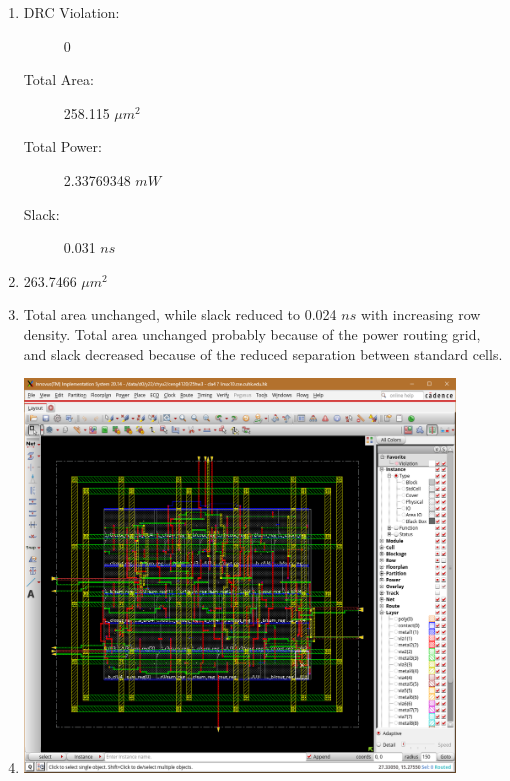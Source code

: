 \documentclass[12pt, a4paper]{article}
\begin{document}
\setcounter{section}{1}

\begin{enumerate}[label=\arabic*.]
    \item 
    \begin{description}
        \item[DRC Violation:] 0
        \item[Total Area:] 258.115 $\mu m^2$
        \item[Total Power:] 2.33769348 $mW$
        \item[Slack:] 0.031 $ns$
    \end{description}
    \item 263.7466 $\mu m^2$
    \item Total area unchanged, while slack reduced to 0.024 $ns$ with increasing row density. 
    Total area unchanged probably because of the power routing grid, 
    and slack decreased because of the reduced separation between standard cells. 
    \item \includegraphics[width=0.9\textwidth]{figs/image.png}
\end{enumerate}
\end{document}
